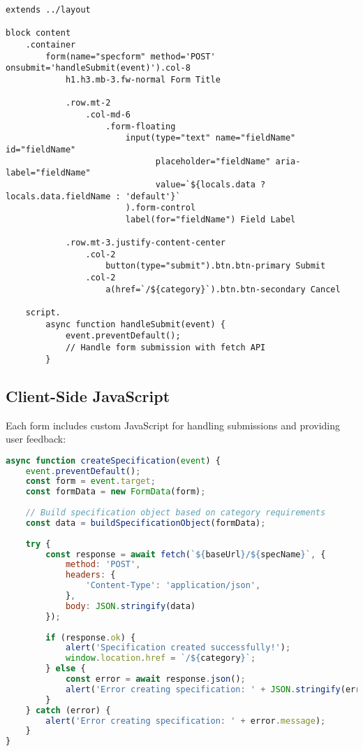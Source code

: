 \documentclass[11pt,a4paper]{article}
\begin{document}
\begin{lstlisting}[language=Pug, caption=Form Template Pattern]
extends ../layout

block content
    .container 
        form(name="specform" method='POST' onsubmit='handleSubmit(event)').col-8
            h1.h3.mb-3.fw-normal Form Title
            
            .row.mt-2
                .col-md-6
                    .form-floating
                        input(type="text" name="fieldName" id="fieldName" 
                              placeholder="fieldName" aria-label="fieldName" 
                              value=`${locals.data ? locals.data.fieldName : 'default'}` 
                        ).form-control 
                        label(for="fieldName") Field Label
            
            .row.mt-3.justify-content-center
                .col-2
                    button(type="submit").btn.btn-primary Submit
                .col-2
                    a(href=`/${category}`).btn.btn-secondary Cancel

    script.
        async function handleSubmit(event) {
            event.preventDefault();
            // Handle form submission with fetch API
        }
\end{lstlisting}

\subsection{Client-Side JavaScript}

Each form includes custom JavaScript for handling submissions and providing user feedback:

\begin{lstlisting}[language=JavaScript, caption=Client-Side Form Handling]
async function createSpecification(event) {
    event.preventDefault();
    const form = event.target;
    const formData = new FormData(form);
    
    // Build specification object based on category requirements
    const data = buildSpecificationObject(formData);
    
    try {
        const response = await fetch(`${baseUrl}/${specName}`, {
            method: 'POST',
            headers: {
                'Content-Type': 'application/json',
            },
            body: JSON.stringify(data)
        });
        
        if (response.ok) {
            alert('Specification created successfully!');
            window.location.href = `/${category}`;
        } else {
            const error = await response.json();
            alert('Error creating specification: ' + JSON.stringify(error));
        }
    } catch (error) {
        alert('Error creating specification: ' + error.message);
    }
}
\end{lstlisting}
\end{document}
